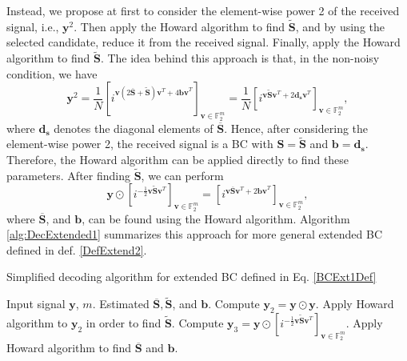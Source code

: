 \documentclass[lettersize,journal,onecolumn]{IEEEtran}
\begin{document}
Instead, we propose at first to consider the element-wise power 2 of the received signal, i.e., $\mathbf{y}^2$. Then apply the Howard algorithm to find $\widetilde{\mathbf{S}}$, and by using the selected candidate, reduce it from the received signal. Finally, apply the Howard algorithm to find $\widetilde{\mathbf{S}}$. The idea behind this approach is that, in the non-noisy condition, we have
 \begin{equation}
 	\mathbf{y}^2=\frac{1}{N}\left[ i^{\mathbf{v} \left(2 \overline{\mathbf{S}}+\widetilde{\mathbf{S}} \right)\mathbf{v}^T +4 \mathbf{b v}^T} \right]_{\mathbf{v} \in \mathbb{F}_2^m}=\frac{1}{N}\left[ i^{\mathbf{v} \widetilde{\mathbf{S}} \mathbf{v}^T +2\mathbf{d}_{\mathbf{s}}\mathbf{v}^T } \right]_{\mathbf{v} \in \mathbb{F}_2^m},
 \end{equation}
where $\mathbf{d}_{\mathbf{s}}$ denotes the diagonal elements of $\overline{\mathbf{S}}$. Hence, after considering the element-wise power 2, the received signal is a BC with $\mathbf{S}=\widetilde{\mathbf{S}}$ and $\mathbf{b}=\mathbf{d}_{\mathbf{s}}$. Therefore, the Howard algorithm can be applied directly to find these parameters. After finding $\mathbf{\widetilde{\mathbf{S}}}$, we can perform 
\begin{equation}
\mathbf{y}\odot \left[ i^{-\frac{1}{2}\mathbf{v}\widetilde{\mathbf{S}} \mathbf{v}^T } \right]_{\mathbf{v} \in \mathbb{F}_2^m} = 	\left[ i^{\mathbf{v}  \overline{\mathbf{S}} \mathbf{v}^T +2 \mathbf{b v}^T} \right]_{\mathbf{v} \in \mathbb{F}_2^m},
\end{equation}
where $\overline{\mathbf{S}}$, and $\mathbf{b}$, can be found using the Howard algorithm. Algorithm \ref{alg:DecExtended1} summarizes this approach for more general extended BC defined in def. \ref{DefExtend2}.
 \begin{algorithm}[!h]
	\caption{Simplified decoding algorithm for extended BC defined in Eq. \ref{BCExt1Def}\label{alg:DecExtended1}}
	\begin{algorithmic}[1]
		\Require Input signal $\mathbf{y}$, $m$.
		\Ensure Estimated $\overline{\mathbf{S}}, \widetilde{\mathbf{S}}$, and $\mathbf{b}$.
		\State Compute $\mathbf{y}_2 = \mathbf{y} \odot \mathbf{y}$.
		\State Apply Howard algorithm to $\mathbf{y}_2$ in order to find $\widetilde{\mathbf{S}}$.
		\State Compute $\mathbf{y}_3 = \mathbf{y}\odot \left[ i^{-\frac{1}{2}\mathbf{v}\widetilde{\mathbf{S}} \mathbf{v}^T } \right]_{\mathbf{v} \in \mathbb{F}_2^m}$.
		\State Apply Howard algorithm to find $\overline{\mathbf{S}}$ and $\mathbf{b}$.
	\end{algorithmic}
\end{algorithm}
\end{document}
